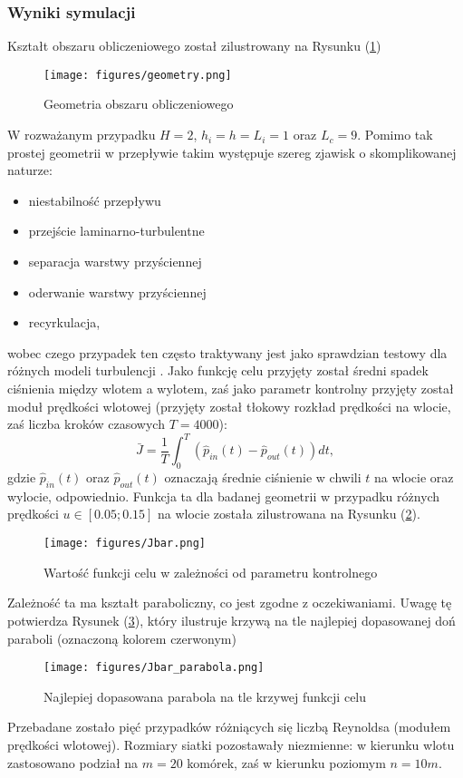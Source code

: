\documentclass[12pt]{article}
\begin{document}
\subsubsection{Wyniki symulacji}
Kształt obszaru obliczeniowego został zilustrowany na Rysunku (\ref{Fig27})
\begin{figure}[H]
	\texttt{[image: figures/geometry.png]} 
	\centering
	\caption{Geometria obszaru obliczeniowego}
	\label{Fig27}
\end{figure}
W rozważanym przypadku $ H = 2 $, $ h_{i}=h=L_{i}=1 $ oraz $ L_{c}=9 $.\newline
Pomimo tak prostej geometrii w przepływie takim występuje szereg zjawisk o skomplikowanej naturze:
\begin{itemize}
	\item niestabilność przepływu
	\item przejście laminarno-turbulentne
	\item separacja warstwy przyściennej
	\item oderwanie warstwy przyściennej
	\item recyrkulacja,
\end{itemize}
wobec czego przypadek ten często traktywany jest jako sprawdzian testowy dla różnych modeli turbulencji \cite{Salazar}. \newline
Jako funkcję celu przyjęty został średni spadek ciśnienia między wlotem a wylotem, zaś jako parametr kontrolny przyjęty został moduł prędkości wlotowej (przyjęty został tłokowy rozkład prędkości na wlocie, zaś liczba kroków czasowych $ T = 4000 $):
\begin{equation}
\bar{J} = \frac{1}{T}\int_{0}^{T}(\hat{p}_{in}(t)-\hat{p}_{out}(t))dt,
\label{J_numerical}
\end{equation}
gdzie $ \hat{p}_{in}(t) $ oraz $ \hat{p}_{out}(t) $ oznaczają średnie ciśnienie w chwili $ t $ na wlocie oraz wylocie, odpowiednio. Funkcja ta dla badanej geometrii w przypadku różnych prędkości $ u \in [0.05 ; 0.15]$ na wlocie została zilustrowana na Rysunku (\ref{Fig28}).
\begin{figure}[H]
	\texttt{[image: figures/Jbar.png]} 
	\centering
	\caption{Wartość funkcji celu w zależności od parametru kontrolnego}
	\label{Fig28}
\end{figure}
Zależność ta ma kształt paraboliczny, co jest zgodne z oczekiwaniami. Uwagę tę potwierdza Rysunek (\ref{Fig29}), który ilustruje krzywą na tle najlepiej dopasowanej doń paraboli (oznaczoną kolorem czerwonym)
\begin{figure}[H]
	\texttt{[image: figures/Jbar\_parabola.png]} 
	\centering
	\caption{Najlepiej dopasowana parabola na tle krzywej funkcji celu}
	\label{Fig29}
\end{figure}
Przebadane zostało pięć przypadków różniących się liczbą Reynoldsa (modułem prędkości wlotowej). Rozmiary siatki pozostawały niezmienne: w kierunku wlotu zastosowano podział na $ m=20 $ komórek, zaś w kierunku poziomym $ n=10m $.
\end{document}
